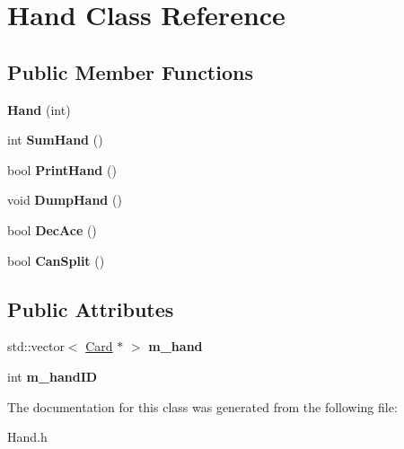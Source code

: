 \hypertarget{class_hand}{}\section{Hand Class Reference}
\label{class_hand}
\subsection*{Public Member Functions}
\begin{DoxyCompactItemize}
\item 
{\bfseries Hand} (int)\hypertarget{class_hand_abaa16c2ffcc48ac2368d79cf810df6c7}{}\label{class_hand_abaa16c2ffcc48ac2368d79cf810df6c7}

\item 
int {\bfseries Sum\+Hand} ()\hypertarget{class_hand_adf9ecdee4a292e32dfee8a2da9c00589}{}\label{class_hand_adf9ecdee4a292e32dfee8a2da9c00589}

\item 
bool {\bfseries Print\+Hand} ()\hypertarget{class_hand_a1bb9cd4961231d7708fdeea731fe5a2e}{}\label{class_hand_a1bb9cd4961231d7708fdeea731fe5a2e}

\item 
void {\bfseries Dump\+Hand} ()\hypertarget{class_hand_aed8546ecef6466d591fe292b45692f74}{}\label{class_hand_aed8546ecef6466d591fe292b45692f74}

\item 
bool {\bfseries Dec\+Ace} ()\hypertarget{class_hand_a434f32de60bcdf7c795537b361658de5}{}\label{class_hand_a434f32de60bcdf7c795537b361658de5}

\item 
bool {\bfseries Can\+Split} ()\hypertarget{class_hand_a2933483fe779dddd638b8a5b6f809bb9}{}\label{class_hand_a2933483fe779dddd638b8a5b6f809bb9}

\end{DoxyCompactItemize}
\subsection*{Public Attributes}
\begin{DoxyCompactItemize}
\item 
std\+::vector$<$ \hyperlink{class_card}{Card} $\ast$ $>$ {\bfseries m\+\_\+hand}\hypertarget{class_hand_a13a8d342aac9dc2f7373ea7f5a6c62c1}{}\label{class_hand_a13a8d342aac9dc2f7373ea7f5a6c62c1}

\item 
int {\bfseries m\+\_\+hand\+ID}\hypertarget{class_hand_ae9f101083045b9ef0b9d75872e550031}{}\label{class_hand_ae9f101083045b9ef0b9d75872e550031}

\end{DoxyCompactItemize}


The documentation for this class was generated from the following file\+:\begin{DoxyCompactItemize}
\item 
Hand.\+h\end{DoxyCompactItemize}
